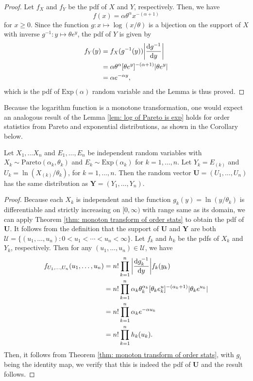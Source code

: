 \documentclass{report}
\begin{document}
\begin{proof}
    Let $f_X$ and $f_Y$ be the pdf of $X$ and $Y$, respectively. Then, we have
    \[ 
        f(x) = \alpha \theta^\alpha x^{-(\alpha+1)}
    \]
        for $x\geqslant 0$. Since the function $g : x \mapsto \log(x/\theta)$ is a bijection
        on the support of $X$ with inverse $g^{-1} : y \mapsto \theta e^y$, the pdf of $Y$
        is given by
        \begin{align*}
            f_Y(y) &= f_X(g^{-1}(y)) \abs{ \dv{g^{-1}}{y}}
            \\
            &= \alpha \theta^{\alpha}[\theta e^y]^{-(\alpha +1)} \abs{\theta e^{y}}
            \\
            &=\alpha e^{-\alpha y},
        \end{align*}
        which is the pdf of $\mathrm{Exp}(\alpha)$ random variable and the Lemma is thus proved.
    \end{proof}

Because the logarithm function is a monotone transformation, one would expect an analogous result
of the Lemma \ref{lem: log of Pareto is exp} holds for order statistics from Pareto
 and exponential distributions, as shown in the Corollary below.

\begin{cor} \label{cor: distribution of log Pareto OS}
    Let $X_1, \ldots X_n$ and $E_1,\ldots, E_n$ be independent random variables with $ X_k \sim \mathrm{Pareto}(\alpha_k,\theta_k)$ and
    $E_k \sim \mathrm{Exp}(\alpha_k)$ for $k =1,\ldots,n$. Let $Y_k = E_{(k)}$ and $U_k = \ln(X_{(k)}/\theta_k)$, for $k =1,\ldots,n$.
    Then the random vector $\mathbf U =(U_1,\ldots, U_n)$ has the same distribution as $\mathbf Y = (Y_1,\ldots,Y_n)$.
\end{cor}

\begin{proof}
    Because each $X_k$ is independent and the function $g_k(y) = \ln(y/\theta_k)$ is differentiable and strictly increasing on $[0,\infty)$ with range same as its domain,
    we can apply Theorem \ref{thm: monoton transform of order stats} to obtain the pdf of $\mathbf U$. It follows from the definition that
    the support of $\mathbf U$ and $\mathbf Y$ are both $\mathcal U = \{(u_1,\ldots,u_n): 0 < u_1 < \cdots < u_n < \infty\}$. Let $f_k$ and $h_k$
    be the pdfs of $X_k$ and $Y_k$, respectively. Then for any $(u_1,\ldots,u_n) \in \mathcal U$, we have
    \begin{align*}
        f_{U_1,\ldots,U_n}(u_1,\ldots,u_n) &=  n! \prod\limits_{k=1}^{n} \abs{ \dv{g_k^{-1}}{y}} f_k(y_k)
        \\
        &= n! \prod\limits_{k=1}^{n} \alpha_k \theta_k^{\alpha_k}[\theta_k e^u_k]^{-(\alpha_k +1)} \abs{\theta_k e^{u_k}}
        \\
        &= n! \prod\limits_{k=1}^{n} \alpha_k e^{-\alpha u_k} 
        \\
        &= n! \prod\limits_{k=1}^{n} h_k(u_k).
    \end{align*}
 Then, it follows from Theorem \ref{thm: monoton transform of order stats}, with $g_i$ being the identity map, we verify that this is indeed the pdf of $\mathbf U$
 and the result follows.
\end{proof}
\end{document}
